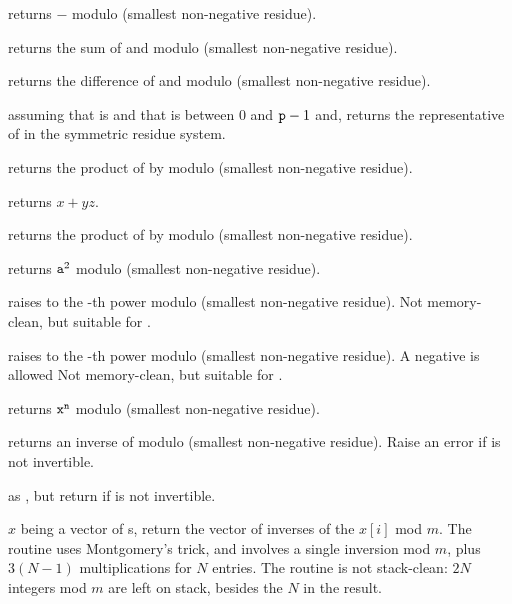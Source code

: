  returns $-$ modulo  (smallest
non-negative residue).

 returns the sum of  and
 modulo  (smallest non-negative residue).

 returns the difference of  and
 modulo  (smallest non-negative residue).

 assuming that  is
 and that  is between $0$ and ${\tt p} - 1$ and,
returns the representative of  in the symmetric residue system.

 returns the product of  by
 modulo  (smallest non-negative residue).

 returns $x + yz$.

 returns the product of  by
 modulo  (smallest non-negative residue).

 returns ${\tt a}^2$ modulo  (smallest
non-negative residue).

 raises  to the -th
power modulo  (smallest non-negative residue). Not memory-clean, but
suitable for .

 raises  to the -th
power modulo  (smallest non-negative residue). A negative  is
allowed Not memory-clean, but suitable for .

 returns ${\tt x}^{\tt n}$
modulo  (smallest non-negative residue).

 returns an inverse of  modulo 
(smallest non-negative residue). Raise an error if  is not invertible.

 as , but return
 if  is not invertible.

 $x$ being a vector of s, return
the vector of inverses of the $x[i]$ mod $m$. The routine uses Montgomery's
trick, and involves a single inversion mod $m$, plus $3(N-1)$ multiplications
for $N$ entries. The routine is not stack-clean: $2N$ integers mod $m$
are left on stack, besides the $N$ in the result.

